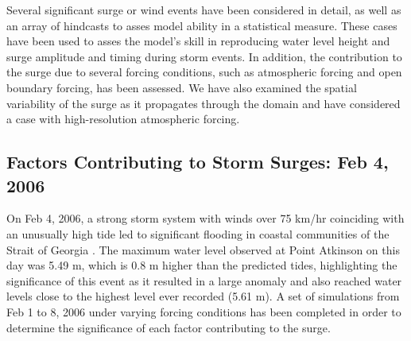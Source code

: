 \documentclass[pdftex,10pt]{article}
\begin{document}
Several significant surge or wind events have been considered in detail, as well as an array of hindcasts to asses model ability in a statistical measure. These cases have been used to asses the model's skill in reproducing water level height and surge amplitude and timing during storm events. In addition, the contribution to the surge due to several forcing conditions, such as atmospheric forcing and open boundary forcing, has been assessed. We have also examined the spatial variability of the surge as it propagates through the domain and have considered a case with high-resolution atmospheric forcing. 



\subsection{Factors Contributing to Storm Surges: Feb 4, 2006}

On Feb 4, 2006, a strong storm system with winds over 75 km/hr coinciding with an unusually high tide led to significant flooding in coastal communities of the Strait of Georgia \citep{romanowski2010storm}. The maximum water level observed at Point Atkinson on this day was 5.49 m, which is 0.8 m higher than the predicted tides, highlighting the significance of this event as it resulted in a large anomaly and also reached water levels close to the highest level ever recorded (5.61 m). A set of simulations from Feb 1 to 8, 2006 under varying forcing conditions has been completed in order to determine the significance of each factor contributing to the surge.
\end{document}
